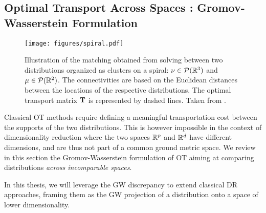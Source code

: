 \subsection{Optimal Transport Across Spaces : Gromov-Wasserstein Formulation}

\begin{figure}[!t]
	\begin{center}
	\centerline{\texttt{[image: figures/spiral.pdf]}}
	\caption{Illustration of the matching obtained from solving  between two distributions organized as clusters on a spiral: $\nu \in {\mathcal{P}}(\mathbb{R}^3)$ and $\mu \in {\mathcal{P}}(\mathbb{R}^2)$. The connectivities are based on the Euclidean distances between the locations of the respective distributions. The optimal transport matrix ${\mathbf{T}}$ is represented by dashed lines. Taken from \citep{vayer2020contribution}.}
	\label{fig:GW_illustration}
	\end{center}
	\vskip -0.3in
\end{figure}

Classical OT methods require defining a meaningful transportation cost between the supports of the two distributions. 
This is however impossible in the context of dimensionality reduction where the two spaces $\mathbb{R}^p$ and $\mathbb{R}^d$ have different dimensions, and are thus not part of a common ground metric space. We review in this section the Gromov-Wasserstein formulation of OT aiming at comparing distributions \emph{across incomparable spaces}.

In this thesis, we will leverage the GW discrepancy to extend classical DR approaches, framing them as the GW projection of a distribution onto a space of lower dimensionality. 

